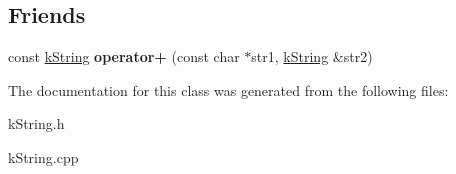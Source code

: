 \subsection*{Friends}
\begin{DoxyCompactItemize}
\item 
const \hyperlink{classkString}{k\+String} {\bfseries operator+} (const char $\ast$str1, \hyperlink{classkString}{k\+String} \&str2)\hypertarget{classkString_a8f69277eb781488af04069997190b36f}{}\label{classkString_a8f69277eb781488af04069997190b36f}

\end{DoxyCompactItemize}


The documentation for this class was generated from the following files\+:\begin{DoxyCompactItemize}
\item 
k\+String.\+h\item 
k\+String.\+cpp\end{DoxyCompactItemize}
